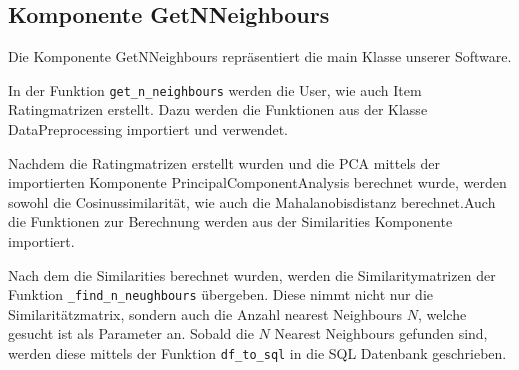 \subsection{Komponente GetNNeighbours}
Die Komponente GetNNeighbours repräsentiert die main Klasse unserer Software. 

In der Funktion \lstinline{get_n_neighbours} werden die User, wie auch Item Ratingmatrizen erstellt. Dazu werden die Funktionen aus der Klasse DataPreprocessing importiert und verwendet. %

Nachdem die Ratingmatrizen erstellt wurden und die PCA mittels der importierten Komponente PrincipalComponentAnalysis berechnet wurde, werden sowohl die Cosinussimilarität, wie auch die Mahalanobisdistanz berechnet.Auch die Funktionen zur Berechnung werden aus der Similarities Komponente importiert.

Nach dem die Similarities berechnet wurden, werden die Similaritymatrizen der Funktion \lstinline{_find_n_neughbours} übergeben. Diese nimmt nicht nur die Similaritätzmatrix, sondern auch die Anzahl nearest Neighbours $N$, welche gesucht ist als Parameter an.
Sobald die $N$ Nearest Neighbours gefunden sind, werden diese mittels der Funktion \lstinline{df_to_sql} in die SQL Datenbank geschrieben.

